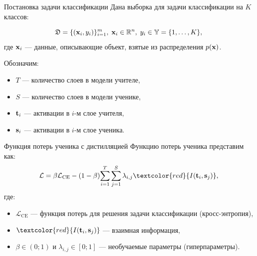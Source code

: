 \documentclass{beamer}
\begin{document}

\begin{frame}{Постановка задачи классификации}
    Дана выборка для задачи классификации на $K$ классов:

    $$\mathfrak{D}  = \{(\bold{x}_i, y_i)\}_{i=1}^{m},\; \bold{x}_i \in \mathbb{R}^n,\; y_i \in \mathbb{Y}  = \{1, \dots, K\},$$
    где $\bold{x}_i$ --- данные, описывающие объект, взятые из распределения $p(\bold{x})$.

    Обозначим:
    \begin{itemize}
        \item $T$ --- количество слоев в модели учителе,
        \item $S$ --- количество слоев в модели ученике,
        \item $\bold{t}_{i}$ --- активации в $i$-м слое учителя,
        \item $\bold{s}_{i}$ --- активации в $i$-м слое ученика.
    \end{itemize}
\end{frame}



\begin{frame}{Функция потерь ученика с дистилляцией}
    Функцию потерь ученика представим как:
    $$
        \mathcal{L} = \beta \mathcal{L}_\text{CE} - (1 - \beta){\sum_{i=1}^T \sum_{j=1}^S \lambda_{i, j}\textcolor{red}{I(\bold{t}_{i}, \bold{s}_{j})}},
    $$
    где:
    \begin{itemize}
        \item $\mathcal{L}_\text{CE}$ --- функция потерь для решения задачи классификации (кросс-энтропия),
        \item $\textcolor{red}{I(\bold{t}_{i}, \bold{s}_{j})}$ --- взаимная информация,
        \item $\beta \in (0;1)$ и $\lambda_{i, j} \in [0;1]$ --- необучаемые параметры (гиперпараметры).
    \end{itemize}
\end{frame}



\end{document}
